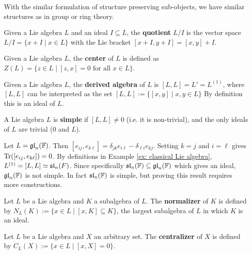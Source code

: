 \documentclass{article}
\begin{document}
\textstart
With the similar formulation of structure preserving sub-objects, we have similar structures as in group or ring theory.

\begin{definition}[Quotient]
    Given a Lie algebra $L$ and an ideal $I \subseteq L$, the \textbf{quotient} $L/I$ is the vector space $L/I = \{ x + I \mid x \in L \}$ with the Lie bracket $[x + I, y + I] = [x, y] + I$.
\end{definition}
\nogap
\begin{definition}[Center]
    Given a Lie algebra $L$, the \textbf{center} of $L$ is defined as $Z(L) = \{ z \in L \mid [z, x] = 0 \text{ for all } x \in L \}$.
\end{definition}
\nogap
\begin{definition}
    Given a Lie algebra $L$, the \textbf{derived algebra} of $L$ is $[L, L] = L' = L^{(1)}$, where $[L, L]$ can be interpreted as the set $[L, L] := \{ [x, y] \mid x, y \in L \}$
    By definition this is an ideal of $L$.
\end{definition}
\nogap
\begin{definition}[Simple]
    A Lie algebra $L$ is \textbf{simple} if $[L, L] \neq 0$ (i.e. it is non-trivial), and the only ideals of $L$ are trivial ($0$ and $L$).
\end{definition}

\begin{example}\label{ex: simple lie algebra}
    Let $L = \mathfrak{gl}_n(\mathbb{F})$. Then $[e_{ij}, e_{k\ell}] = \delta_{jk} e_{i \ell} - \delta_{\ell i} e_{kj}$. Setting $k = j$ and $i = \ell$ gives $\operatorname{Tr}([e_{ij}, e_{k\ell}]) = 0$. By definitions in Example \ref{ex: classical Lie algebra}, $L^{(1)} = [L, L] \simeq \mathfrak{sl}_n(F)$. Since specifically $\mathfrak{sl}_n(\mathbb{F}) \subseteq \mathfrak{gl}_n(\mathbb{F})$ which gives an ideal, $\mathfrak{gl}_n(\mathbb{F})$ is not simple. In fact $\mathfrak{sl}_n(\mathbb{F})$ is simple, but proving this result requires more constructions.
\end{example}

\begin{definition}[Normalizer]
    Let $L$ be a Lie algebra and $K$ a subalgebra of $L$. The \textbf{normalizer} of $K$ is defined by $N_L(K) := \{ x \in L \mid [x, K] \subseteq K \}$, the largest subalgebra of $L$ in which $K$ is an ideal.
\end{definition}
\nogap
\begin{definition}[Centralizer]
    Let $L$ be a Lie algebra and $X$ an arbitrary set. The \textbf{centralizer} of $X$ is defined by $C_L(X) := \{ x \in L \mid [x, X] = 0 \}$.
\end{definition}
\end{document}
